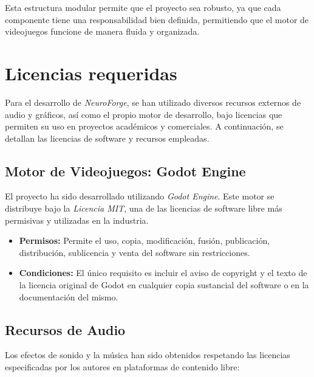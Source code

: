 Esta estructura modular permite que el proyecto sea robusto, ya que cada componente tiene una responsabilidad bien definida, permitiendo que el motor de videojuegos funcione de manera fluida y organizada.

\section{Licencias requeridas}

Para el desarrollo de \textit{NeuroForge}, se han utilizado diversos recursos externos de audio y gráficos, así como el propio motor de desarrollo, bajo licencias que permiten su uso en proyectos académicos y comerciales. A continuación, se detallan las licencias de software y recursos empleadas.

\subsection{Motor de Videojuegos: Godot Engine}

El proyecto ha sido desarrollado utilizando \textit{Godot Engine}. Este motor se distribuye bajo la \textit{Licencia MIT}, una de las licencias de software libre más permisivas y utilizadas en la industria.

\begin{itemize}
	\item \textbf{Permisos:} Permite el uso, copia, modificación, fusión, publicación, distribución, sublicencia y venta del software sin restricciones.
	\item \textbf{Condiciones:} El único requisito es incluir el aviso de copyright y el texto de la licencia original de Godot en cualquier copia sustancial del software o en la documentación del mismo.
\end{itemize}

\subsection{Recursos de Audio}

Los efectos de sonido y la música han sido obtenidos respetando las licencias especificadas por los autores en plataformas de contenido libre:

